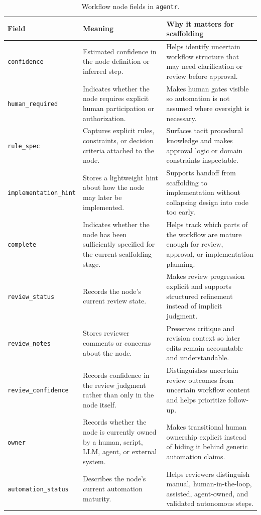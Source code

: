\begin{table}[htbp]
\centering
\caption{Workflow node fields in \texttt{agentr}.}
\begin{tabular}{p{2.8cm} p{5.0cm} p{6.0cm}}
\hline
\textbf{Field} & \textbf{Meaning} & \textbf{Why it matters for scaffolding} \\
\hline
\texttt{confidence} & Estimated confidence in the node definition or inferred step. & Helps identify uncertain workflow structure that may need clarification or review before approval. \\
\texttt{human\_required} & Indicates whether the node requires explicit human participation or authorization. & Makes human gates visible so automation is not assumed where oversight is necessary. \\
\texttt{rule\_spec} & Captures explicit rules, constraints, or decision criteria attached to the node. & Surfaces tacit procedural knowledge and makes approval logic or domain constraints inspectable. \\
\texttt{implementation\_hint} & Stores a lightweight hint about how the node may later be implemented. & Supports handoff from scaffolding to implementation without collapsing design into code too early. \\
\texttt{complete} & Indicates whether the node has been sufficiently specified for the current scaffolding stage. & Helps track which parts of the workflow are mature enough for review, approval, or implementation planning. \\
\texttt{review\_status} & Records the node's current review state. & Makes review progression explicit and supports structured refinement instead of implicit judgment. \\
\texttt{review\_notes} & Stores reviewer comments or concerns about the node. & Preserves critique and revision context so later edits remain accountable and understandable. \\
\texttt{review\_confidence} & Records confidence in the review judgment rather than only in the node itself. & Distinguishes uncertain review outcomes from uncertain workflow content and helps prioritize follow-up. \\
\texttt{owner} & Records whether the node is currently owned by a human, script, LLM, agent, or external system. & Makes transitional human ownership explicit instead of hiding it behind generic automation claims. \\
\texttt{automation\_status} & Describes the node's current automation maturity. & Helps reviewers distinguish manual, human-in-the-loop, assisted, agent-owned, and validated autonomous steps. \\

\end{tabular}
\end{table}
